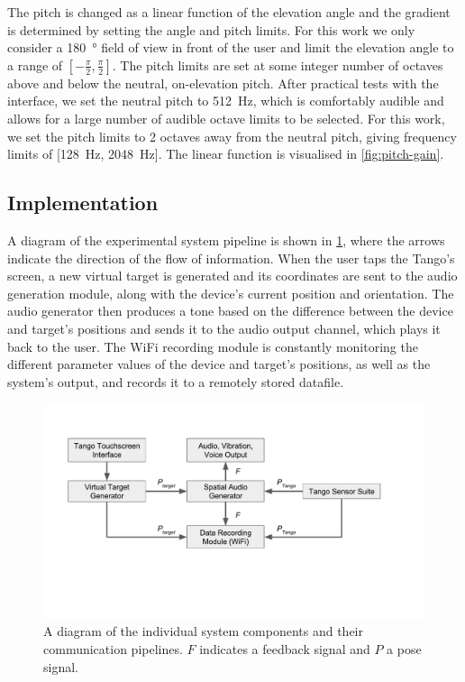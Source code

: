\documentclass{llncs}
\begin{document}
The pitch is changed as a linear function of the elevation angle and the gradient is determined by setting the angle and pitch limits.
For this work we only consider a \SI{180}{\degree} field of view in front of the user and limit the elevation angle to a range of $[-\frac{\pi}{2}, \frac{\pi}{2}]$.
The pitch limits are set at some integer number of octaves above and below the neutral, on-elevation pitch.
After practical tests with the interface, we set the neutral pitch to \SI{512}{\hertz}, which is comfortably audible and allows for a large number of audible octave limits to be selected.
For this work, we set the pitch limits to 2 octaves away from the neutral pitch, giving frequency limits of [\SI{128}{\hertz}, \SI{2048}{\hertz}].
The linear function is visualised in \cref{fig:pitch-gain}.

\subsection{Implementation}

A diagram of the experimental system pipeline is shown in \cref{fig:pipeline}, where the arrows indicate the direction of the flow of information.
When the user taps the Tango's screen, a new virtual target is generated and its coordinates are sent to the audio generation module, along with the device's current position and orientation.
The audio generator then produces a tone based on the difference between the device and target's positions and sends it to the audio output channel, which plays it back to the user.
The WiFi recording module is constantly monitoring the different parameter values of the device and target's positions, as well as the system's output, and records it to a remotely stored datafile. 

\begin{figure}
  \centering
  \includegraphics[clip=true, trim=0 120 80 50, width=0.8\columnwidth]{figures/pipeline.pdf}
  \caption{A diagram of the individual system components and their communication pipelines. $F$ indicates a feedback signal and $P$ a pose signal. }\label{fig:pipeline}
\end{figure}
\end{document}
